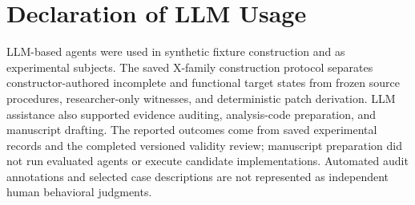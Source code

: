 \section*{Declaration of LLM Usage}
LLM-based agents were used in synthetic fixture construction and as experimental subjects. The saved X-family construction protocol separates constructor-authored incomplete and functional target states from frozen source procedures, researcher-only witnesses, and deterministic patch derivation. LLM assistance also supported evidence auditing, analysis-code preparation, and manuscript drafting. The reported outcomes come from saved experimental records and the completed versioned validity review; manuscript preparation did not run evaluated agents or execute candidate implementations. Automated audit annotations and selected case descriptions are not represented as independent human behavioral judgments.
